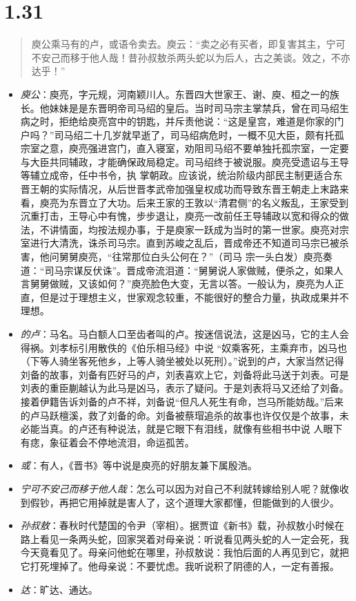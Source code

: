 \documentclass[]{book}
\providecommand{\tightlist}{%
  \setlength{\itemsep}{0pt}\setlength{\parskip}{0pt}}
\begin{document}
\section{1.31}\label{section-30}

\begin{quote}
庾公乘马有的卢，或语令卖去。庾云：``卖之必有买者，即复害其主，宁可不安己而移于他人哉！昔孙叔敖杀两头蛇以为后人，古之美谈。效之，不亦达乎！''
\end{quote}

\begin{itemize}
\tightlist
\item
  \emph{庾公}：庾亮，字元规，河南颖川人。东晋四大世家王、谢、庾、桓之一的族长。他妹妹是是东晋明帝司马绍的皇后。当时司马宗主掌禁兵，曾在司马绍生病之时，拒绝给庾亮宫中的钥匙，并斥责他说：``这是皇宫，难道是你家的门户吗？''司马绍二十几岁就早逝了，司马绍病危时，一概不见大臣，颇有托孤宗室之意，庾亮强进宫门，直入寝室，劝阻司马绍不要单独托孤宗室，一定要与大臣共同辅政，才能确保政局稳定。司马绍终于被说服。庾亮受遗诏与王导等辅立成帝，任中书令，执
  掌朝政。应该说，统治阶级内部民主制更适合东晋王朝的实际情况，从后世晋孝武帝加强皇权成功而导致东晋王朝走上末路来看，庾亮为东晋立了大功。后来王家的王敦以``清君侧''的名义叛乱，王家受到沉重打击，王导心中有愧，步步退让，庾亮一改前任王导辅政以宽和得众的做法，不讲情面，均按法规办事，于是庾家一跃成为当时的第一世家。庾亮对宗室进行大清洗，诛杀司马宗。直到苏峻之乱后，晋成帝还不知道司马宗已被杀害，他问舅舅庾亮，``往常那位白头公何在？''（司马
  宗一头白发）庾亮奏道：``司马宗谋反伏诛''。晋成帝流泪道：``舅舅说人家做贼，便杀之，如果人言舅舅做贼，又该如何？''庾亮脸色大变，无言以答。一般认为，庾亮为人正直，但是过于理想主义，世家观念较重，不能很好的整合力量，执政成果并不理想。
\item
  \emph{的卢}：马名。马白额人口至齿者叫的卢。按迷信说法，这是凶马，它的主人会得祸。刘孝标引用散佚的《伯乐相马经》中说
  ``奴乘客死，主乘弃市，凶马也（下等人骑坐客死他乡，上等人骑坐被处以死刑）。''说到的卢，大家当然记得刘备的故事，刘备有匹好马的卢，刘表喜欢上它，刘备将此马送于刘表。可是刘表的重臣蒯越认为此马是凶马，表示了疑问。于是刘表将马又还给了刘备。接着伊籍告诉刘备的卢不祥，刘备说``但凡人死生有命，岂马所能妨哉。''后来的卢马跃檀溪，救了刘备的命。刘备被蔡瑁追杀的故事也许仅仅是个故事，未必能当真。的卢还有种说法，就是它眼下有泪线，就像有些相书中说
  人眼下有痣，象征着会不停地流泪，命运孤苦。
\item
  \emph{或}：有人，《晋书》等中说是庾亮的好朋友兼下属殷浩。
\item
  \emph{宁可不安己而移于他人哉}：怎么可以因为对自己不利就转嫁给别人呢？就像收到假钞，再把它用掉就是害人了，这个道理大家都懂，但能做到的人很少。
\item
  \emph{孙叔敖}：春秋时代楚国的令尹（宰相）。据贾谊《新书》载，孙叔敖小时候在路上看见一条两头蛇，回家哭着对母亲说：听说看见两头蛇的人一定会死，我今天竟看见了。母亲问他蛇在哪里，孙叔敖说：我怕后面的人再见到它，就把它打死埋掉了。他母亲说：不要忧虑。我听说积了阴德的人，一定有善报。
\item
  \emph{达}：旷达、通达。
\end{itemize}
\end{document}
